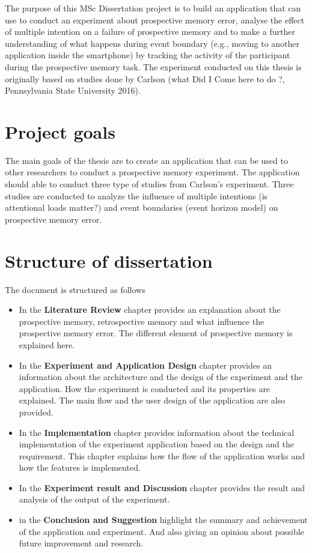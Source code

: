 The purpose of this MSc Dissertation project is to build an application that can use to conduct an experiment about prospective memory error, analyse the effect of multiple intention on a failure of prospective memory and to make a further understanding of what happens
during event boundary (e.g., moving to another application inside the smartphone) by tracking the activity of the participant during the prospective memory task.
The experiment conducted on this thesis is originally based on studies done by Carlson (what Did I Come here to do ?, Pennsylvania State University 2016).


\section{Project goals}
The main goals of the thesis are to create an application that can be used to other researchers to conduct a prospective memory experiment.
The application should able to conduct three type of studies from Carlson's experiment.
Three studies are conducted to analyze the influence of multiple intentions (is attentional loads matter?) and event boundaries (event horizon model)
on prospective memory error.

\section{Structure of dissertation}

The document is structured as follows
\begin{itemize}
\item In the \textbf{Literature Review} chapter provides an explanation about the prospective memory, retrospective memory and what influence the prospective memory error.
The different element of prospective memory is explained here.

\item In the \textbf{Experiment and Application Design} chapter provides an information about the architecture and the design of the experiment and the application.
How the experiment is conducted and its properties are explained. The main flow and the user design of the application are also provided.

\item In the \textbf{Implementation} chapter provides information about the technical implementation of the experiment application based on the design and the requirement.
 This chapter explains how the flow of the application works and how the features is implemented.

\item In the \textbf{Experiment result and Discussion} chapter provides the result and analysis of the output of the experiment.

\item in the \textbf{Conclusion and Suggestion} highlight the summary and achievement of the application and experiment. And also giving an opinion about possible future improvement and research.


\end{itemize}
